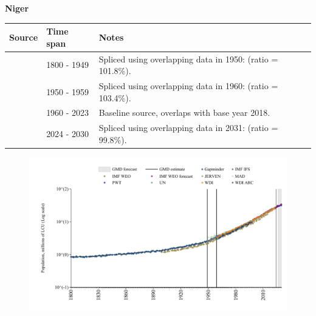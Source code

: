\documentclass[12pt,a4paper,landscape]{article}
\begin{document}
\begin{adjustbox}{max totalsize={\paperwidth}{\paperheight},center}
\begin{minipage}[t][\textheight][t]{\textwidth}
\vspace*{0.5cm}
{}
\begin{center}
{\Large\bfseries Niger}
\end{center}
\vspace{0.5cm}
\begin{table}[H]
\centering
\small
\begin{tabular}{|l|l|l|}
\hline
\textbf{Source} & \textbf{Time span} & \textbf{Notes} \\
\hline
\rowcolor{white}\cite{Gapminder}& 1800 - 1949 &Spliced using overlapping data in 1950: (ratio = 101.8\%).\\
\rowcolor{lightgray}\cite{IMF_IFS}& 1950 - 1959 &Spliced using overlapping data in 1960: (ratio = 103.4\%).\\
\rowcolor{white}\cite{WDI}& 1960 - 2023 &Baseline source, overlaps with base year 2018.\\
\rowcolor{lightgray}\cite{Gapminder}& 2024 - 2030 &Spliced using overlapping data in 2031: (ratio = 99.8\%).\\
\hline
\end{tabular}
\end{table}
\begin{figure}[H]
\centering
\includegraphics[width=\textwidth,height=0.6\textheight,keepaspectratio]{graphs/NER_pop.pdf}
\end{figure}
\end{minipage}
\end{adjustbox}
\end{document}

